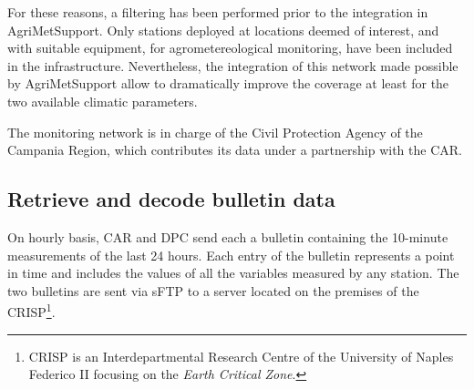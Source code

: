 \documentclass[authoryear,preprint,review,12pt]{elsarticle}
\begin{document}
For these reasons, a filtering has been performed prior to the integration in AgriMetSupport.
Only stations deployed at locations deemed of interest, and with suitable equipment, for agrometereological monitoring, have been included in the infrastructure.
Nevertheless, the integration of this network made possible by AgriMetSupport allow to dramatically improve the coverage at least for the two available climatic parameters.

The monitoring network is in charge of the Civil Protection Agency of the Campania Region, which contributes its data under a partnership with the CAR.

\subsection{Retrieve and decode bulletin data}
On hourly basis, CAR and DPC send each a bulletin containing the 10-minute measurements of the last 24 hours.
Each entry of the bulletin represents a point in time and includes the values of all the variables measured by any station.
The two bulletins are sent via sFTP to a server located on the premises of the CRISP\footnote{CRISP is an Interdepartmental Research Centre of the University of Naples Federico II focusing on the \textit{Earth Critical Zone}.}.

 
\end{document}
